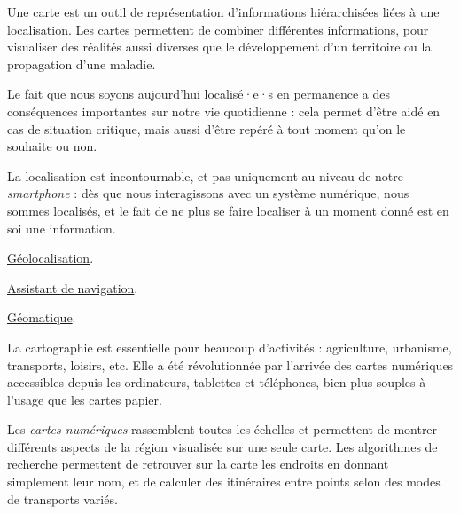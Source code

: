 \begin{jazzitemize}
\item Une carte est un outil de représentation d'informations hiérarchisées liées à une localisation.  Les cartes permettent de combiner différentes informations,  pour visualiser des réalités aussi diverses que le développement d'un territoire ou la propagation d'une maladie.
\item Le fait que nous soyons aujourd'hui localisé·e·s en permanence a des conséquences importantes sur notre vie quotidienne : cela permet d'être aidé en cas de situation critique, mais aussi d'être repéré à tout moment qu'on le souhaite ou non.
\item La localisation est incontournable, et pas uniquement au niveau de notre \textit{smartphone} : dès que nous interagissons avec un système numérique, nous sommes localisés, et le fait de ne plus se faire localiser à un moment donné est en soi une information.
\end{jazzitemize}


\begin{jazzitemize}
\item \href{https://fr.wikipedia.org/wiki/G\%C3\%A9olocalisation}{Géolocalisation}.
\item \href{https://fr.wikipedia.org/wiki/GPS_(assistant_de_navigation)}{Assistant de navigation}.
\item \href{https://fr.wikipedia.org/wiki/G\%C3\%A9omatique}{Géomatique}.
\end{jazzitemize}


\begin{tcolorbox}[title={Introduction}, toprule=0pt, leftrule=0pt, rightrule=0pt, arc=0pt,
                  fonttitle=\scshape\boxtitlefont,
                  colbacktitle=white, coltitle=firstcolor, colframe=firstcolor, colback=firstcolor!10,
                  breakable, enhanced jigsaw]
La cartographie est essentielle pour beaucoup d’activités : agriculture, urbanisme, transports, loisirs, etc. Elle a été révolutionnée par l’arrivée des cartes numériques accessibles depuis les ordinateurs, tablettes et téléphones, bien plus souples à l’usage que les cartes papier.

Les \emph{cartes numériques} rassemblent toutes les échelles et permettent de montrer différents aspects de la région visualisée sur une seule carte. Les algorithmes de recherche permettent de retrouver sur la carte les endroits en donnant simplement leur nom, et de calculer des itinéraires entre points selon des modes de transports variés.
\end{tcolorbox}

